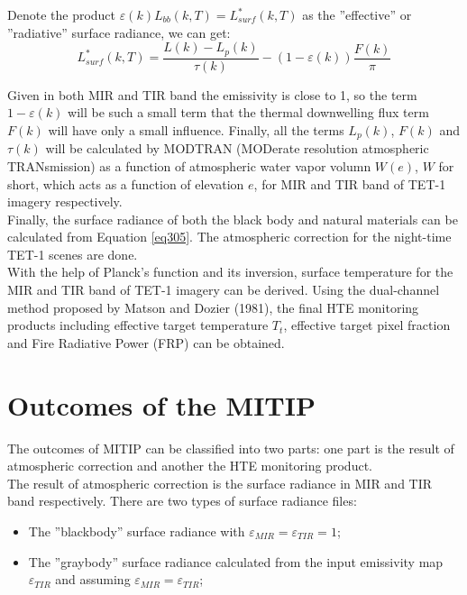 \noindent Denote the product $\varepsilon(k) L_{bb}(k, T) = L_{surf}^*(k, T)$ as the ''effective'' or ''radiative'' surface radiance, we can get:
\begin{equation}
\label{eq305}
L_{surf}^*(k, T) = \frac{L(k) - L_p(k)}{\tau (k)} - (1 - \varepsilon (k)) \frac{F(k)}{\pi}
\end{equation}

\noindent Given in both MIR and TIR band the emissivity is close to 1, so the term $1 - \varepsilon (k)$ will be such a small term that the thermal downwelling flux term $F(k)$ will have only a small influence. Finally, all the terms $L_p(k)$, $F(k)$ and $\tau (k)$ will be calculated by MODTRAN (MODerate resolution atmospheric TRANsmission) as a function of atmospheric water vapor volumn $W(e)$, $W$ for short, which acts as a function of elevation $e$, for MIR and TIR band of TET-1 imagery respectively.\\

\noindent Finally, the surface radiance of both the black body and natural materials can be calculated from Equation \eqref{eq305}. The atmospheric correction for the night-time TET-1 scenes are done.\\

\noindent With the help of Planck's function and its inversion, surface temperature for the MIR and TIR band of TET-1 imagery can be derived. Using the dual-channel method proposed by Matson and Dozier (1981), the final HTE monitoring products including effective target temperature $T_t$, effective target pixel fraction and Fire Radiative Power (FRP) can be obtained.\\


\section{Outcomes of the MITIP}
The outcomes of MITIP can be classified into two parts: one part is the result of atmospheric correction and another the HTE monitoring product.\\

\noindent The result of atmospheric correction is the surface radiance in MIR and TIR band respectively. There are two types of surface radiance files:
\begin{itemize}
\item The ''blackbody'' surface radiance with $\varepsilon_{MIR} = \varepsilon_{TIR} = 1$;
\item The ''graybody'' surface radiance calculated from the input emissivity map $\varepsilon_{TIR}$ and assuming $\varepsilon_{MIR} = \varepsilon_{TIR}$;
\end{itemize}

